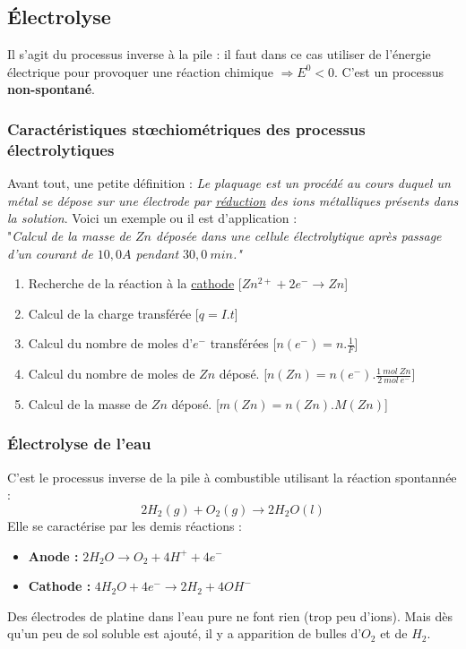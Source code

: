 \documentclass[12pt, a4paper]{article}
\begin{document}
\subsection{Électrolyse}
Il s'agit du processus inverse à la pile : il faut dans ce cas utiliser de l'énergie électrique pour provoquer une réaction chimique $\Rightarrow E^0 <0$. C'est un processus \textbf{non-spontané}.

\subsubsection*{Caractéristiques stœchiométriques des processus électrolytiques}
Avant tout, une petite définition : \textit{Le plaquage est un procédé au cours duquel un métal se dépose sur une électrode par \underline{réduction} des ions métalliques présents dans la solution}. Voici un exemple ou il est d'application :\\

"\textit{Calcul de la masse de $Zn$ déposée dans une cellule électrolytique après passage d'un courant de $10,0A$ pendant $30,0\ min$."}
\begin{enumerate}
\item Recherche de la réaction à la \underline{cathode} [$Zn^{2+} + 2e^- \rightarrow Zn$]
\item Calcul de la charge transférée [$q = I.t$]
\item Calcul du nombre de moles d'$e^-$ transférées [$n(e^-) = n.\frac{1}{F} $]
\item Calcul du nombre de moles de $Zn$ déposé. [$n(Zn) = n(e^-).\frac{1\ mol\ Zn}{2\ mol\ e^-}$]
\item Calcul de la masse de $Zn$ déposé. [$m(Zn) = n(Zn).M(Zn)$]
\end{enumerate}

\subsubsection{Électrolyse de l'eau}
C'est le processus inverse de la pile à combustible utilisant la réaction spontannée : 
$$2H_2 (g) + O_2 (g) \rightarrow 2 H_2O (l)$$
Elle se caractérise par les demis réactions :
\begin{itemize}
\item \textbf{Anode :} $2H_2O \rightarrow O_2 + 4H^+ + 4e^-$
\item \textbf{Cathode :} $4 H_2O + 4e^- \rightarrow 2 H_2 + 4 OH^-$
\end{itemize}
Des électrodes de platine dans l'eau pure ne font rien (trop peu d'ions). Mais dès qu'un peu de sol soluble est ajouté, il y a apparition de bulles d'$O_2$ et de $H_2$.\\
\end{document}
